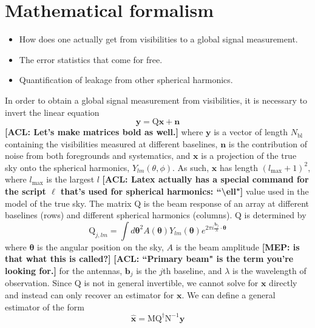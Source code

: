\documentclass[twolcolumn,apj]{emulateapj}
\newcommand{\acl}[1]{{\color{red} \textbf{[ACL:  #1]}}}
\newcommand{\mep}[1]{{\color{blue} \textbf{[MEP:  #1]}}}
\begin{document}
\section{Mathematical formalism}
\begin{itemize}
\item How does one actually get from visibilities to a global signal measurement.
\item The error statistics that come for free.
\item Quantification of leakage from other spherical harmonics.
\end{itemize}

In order to obtain a global signal measurement from visibilities, it is necessary to invert the linear equation 
\begin{equation}
\mathbf{y} = \textrm{Q} \mathbf{x} + \mathbf{n}
\end{equation}
\acl{Let's make matrices bold as well.} where $\mathbf{y}$ is a vector of length $N_{\textrm{bl}}$ containing the visibilities measured at different baselines, $\mathbf{n}$ is the contribution of noise from both foregrounds and systematics, and $\mathbf{x}$ is a projection of the true sky onto the spherical harmonics, $Y_{lm}(\theta,\phi)$. As such, $\mathbf{x}$ has length $(l_{\textrm{max}}+1)^2$, where $l_{\textrm{max}}$ is the largest $l$ \acl{Latex actually has a special command for the script $\ell$ that's used for spherical harmonics: ``\textbackslash ell"} value used in the model of the true sky. The matrix $\textrm{Q}$ is the beam response of an array at different baselines (rows) and different spherical harmonics (columns). $\textrm{Q}$ is determined by 
\begin{equation}
\textrm{Q}_{j,lm} = \int d \boldsymbol \theta^2 A(\boldsymbol \theta) Y_{lm}(\boldsymbol \theta) e^{2\pi i \frac{\mathbf{b_\textit{j}}}{\lambda} \cdot \boldsymbol \theta}
\end{equation}
where $\boldsymbol \theta$ is the angular position on the sky, $A$ is the beam amplitude \mep{is that what this is called?} \acl{``Primary beam" is the term you're looking for.} for the antennas, $\mathbf{b_{\textit{j}}}$ is the $j$th baseline, and $\lambda$ is the wavelength of observation. Since $\textrm{Q}$ is not in general invertible, we cannot solve for $\mathbf{x}$ directly and instead can only recover an estimator for $\mathbf{x}$. We can define a general estimator of the form 
\begin{equation}
\mathbf{\hat x} = \textrm{M} \textrm{Q}^\dagger \textrm{N}^{-1} \mathbf{y}
\end{equation}
\end{document}
